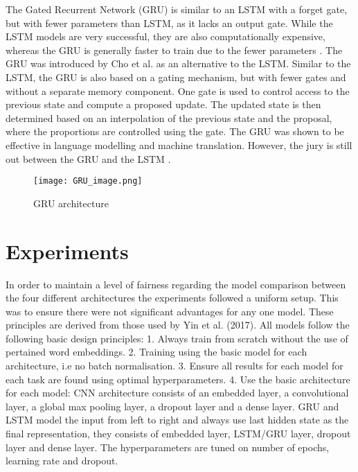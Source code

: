 \documentclass[twocolumn,12pt]{asme2ej}
\begin{document}
The Gated Recurrent Network (GRU) is similar to an LSTM with a forget gate, but with fewer parameters than LSTM, as it lacks an output gate. While the LSTM models are very successful, they are also computationally expensive, whereas the GRU is generally faster to train due to the fewer parameters \cite{PrimerNeuralNetworkModelsforNaturalLanguageProcessin}. The GRU was introduced by Cho et al. as an alternative to the LSTM. Similar to the LSTM, the GRU is also based on a gating mechanism, but with fewer gates and without a separate memory component. One gate is used to control access to the previous state and compute a proposed update. The updated state is then determined based on an interpolation of the previous state and the proposal, where the proportions are controlled using the gate.
The GRU was shown to be effective in language modelling and machine translation. However, the jury is still out between the GRU and the LSTM \cite{PrimerNeuralNetworkModelsforNaturalLanguageProcessin}.

\begin{figure}[h]
    \centering
    \texttt{[image: GRU\_image.png]}
    \caption{GRU architecture}
    \label{fig:my_label}
\end{figure}


\section{Experiments}

In order to maintain a level of fairness regarding the model comparison between the four different architectures the experiments followed a uniform setup. This was to ensure there were not significant advantages for any one model. These principles are derived from those used by Yin et al. (2017). All models follow the following basic design principles: 1. Always train from scratch without the use of pertained word embeddings. 2. Training using the basic model for each architecture, i.e no batch normalisation. 3. Ensure all results for each model for each task are found using optimal hyperparameters. 4. Use the basic architecture for each model: CNN architecture consists of an embedded layer, a convolutional layer, a global max pooling layer, a dropout layer and a dense layer. GRU and LSTM model the input from left to right and always use last hidden state as the final representation, they consists of embedded layer, LSTM/GRU layer, dropout layer and dense layer.
The hyperparameters are tuned on number of epochs, learning rate and dropout.
\end{document}
